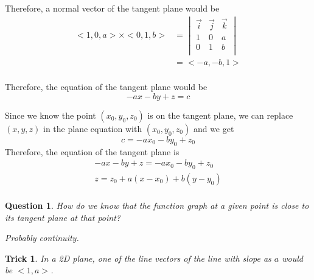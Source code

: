 \documentclass{article}
\newtheorem*{trick}{Trick}
\newtheorem*{question}{Question}
\begin{document}
Therefore, a normal vector of the tangent plane would be
\begin{equation}
\begin{split}
  <1, 0, a> \times <0, 1, b>
  &= \begin{vmatrix}
       \vec{i} & \vec{j} & \vec{k} \\
       1 & 0 & a \\
       0 & 1 & b \\ 
     \end{vmatrix} \\
  &= <-a, -b, 1> \\
\end{split}
\end{equation}

Therefore, the equation of the tangent plane would be
\begin{equation*}
  -ax - by + z = c
\end{equation*}

Since we know the point $(x_0, y_0, z_0)$ is on the tangent plane, we can 
replace $(x, y, z)$ in the plane equation with $(x_0, y_0, z_0)$ and we get
\begin{equation*}
  c = -ax_0 - by_0 + z_0
\end{equation*}
Therefore, the equation of the tangent plane is 
\begin{gather*}
  -ax - by + z = -ax_0 - by_0 + z_0 \\
  z = z_0 + a(x - x_0) + b(y - y_0) \\
\end{gather*}

\begin{question}
How do we know that the function graph at a given point is close to its tangent 
plane at that point?

Probably continuity.
\end{question}

\begin{trick}
In a 2D plane, one of the line vectors of the line with slope as $a$ would be 
$<1, a>$.
\end{trick}
\end{document}
